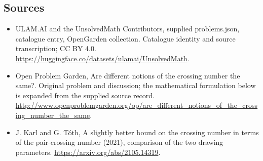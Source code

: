 \documentclass[11pt,a4paper]{article}
\begin{document}
\subsection{Sources}
\begin{itemize}
\item[S1] ULAM.AI and the UnsolvedMath Contributors, supplied problems.json, catalogue entry, OpenGarden collection. Catalogue identity and source transcription; CC BY 4.0.
\url{https://huggingface.co/datasets/ulamai/UnsolvedMath}.
\item[S2] Open Problem Garden, Are different notions of the crossing number the same?. Original problem and discussion; the mathematical formulation below is expanded from the supplied source record.
\url{http://www.openproblemgarden.org/op/are_different_notions_of_the_crossing_number_the_same}.
\item[S3] J. Karl and G. Tóth, A slightly better bound on the crossing number in terms of the pair-crossing number (2021), comparison of the two drawing parameters.
\url{https://arxiv.org/abs/2105.14319}.
\end{itemize}
\end{document}
